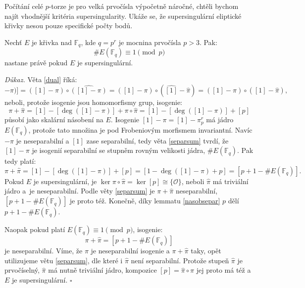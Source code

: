 \documentclass[12pt]{report}
\begin{document}
Počítání celé $p$-torze je pro velká prvočísla výpočetně náročné, chtěli bychom najít vhodnější kritéria supersingularity. Ukáže se, že supersingulární eliptické křivky nesou pouze specifické počty bodů.

\begin{veta}\label{super}
Nechť $E$ je křivka nad $\mathbb{F}_q$, kde $q = p^r$ je mocnina prvočísla $p > 3$. Pak: $$\# E(\mathbb{F}_q) \equiv 1 \pmod{p}$$ nastane právě pokud $E$ je supersingulární.
\end{veta}

\noindent \textit{Důkaz.} Věta \ref{dual} říká:
\begin{equation*}
[\deg([1]-\pi)] = ([1]-\pi) \circ \widehat{([1]-\pi)} = ([1]-\pi) \circ (\widehat{[1]}-\widehat{\pi}) = ([1]-\pi) \circ ([1]-\widehat{\pi}),
\end{equation*} 
neboli, protože isogenie jsou homomorfismy grup, isogenie:
\begin{equation*}
\pi+\widehat{\pi} = [1] - [\deg([1]-\pi)]+\pi \circ \widehat{\pi} = [1]-[\deg([1]-\pi)]+[p]
\end{equation*}
působí jako skalární násobení na $E$. Isogenie $[1]-\pi = [1] - \pi_p ^r$ má jádro $E(\mathbb{F}_q)$, protože tato množina je pod Frobeniovým morfismem invariantní. Navíc $-\pi$ je neseparabilní a $[1]$ zase separabilní, tedy věta \ref{separsum} tvrdí, že $[1]-\pi$ je isogenií separabilní se stupněm rovným velikosti jádra, $\#E(\mathbb{F}_q)$. Pak tedy platí:
\begin{equation*}
\pi+\widehat{\pi}  = [1]-[\deg([1]-\pi)]+[p] = [1-\deg ([1]-\pi)+p] =  [p+1-\#E(\mathbb{F}_q)].
\end{equation*}
Pokud $E$ je supersingulární, je $\ker \pi \circ \widehat{\pi} = \ker [p] \cong \lbrace \mathcal{O} \rbrace$, neboli $\widehat{\pi}$ má triviální jádro a~je neseparabilní. Podle věty \ref{separsum} je $\pi+\widehat{\pi}$ neseparabilní, $[p+1-\#E(\mathbb{F}_q)]$ je proto též.  Konečně, díky lemmatu \ref{nasobsepar} $p$ dělí $p+1-\#E(\mathbb{F}_q)$.

Naopak pokud platí $E(\mathbb{F}_q) \equiv 1 \pmod{p}$, isogenie: $$\pi+\widehat{\pi} = [p+1-\#E(\mathbb{F}_q)]$$ je neseparabilní. Víme, že $\pi$ je neseparabilní isogenie a $\pi+\widehat{\pi}$ taky, opět utilizujeme větu \ref{separsum}, dle které i $\widehat{\pi}$ není separabilní. Protože stupeň $\widehat{\pi}$ je prvočíselný, $\widehat{\pi}$ má nutně triviální jádro, kompozice $[p] = \widehat{\pi} \circ \pi$ jej proto má též a $E$ je supersingulární. \hfill $\square$\\
\end{document}
